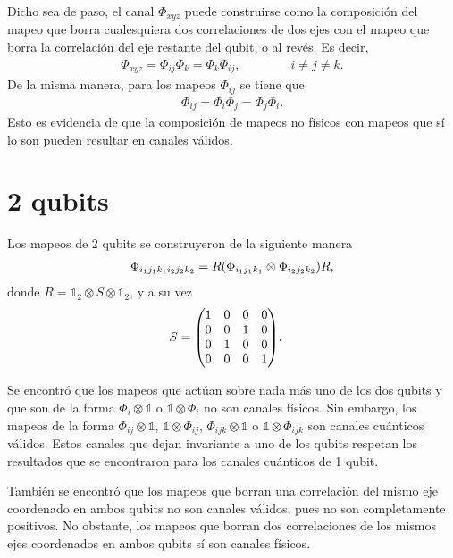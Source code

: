 \documentclass[11pt]{article}
\begin{document}
Dicho sea de paso, el canal $\Phi_{xyz}$ puede construirse como la composición del mapeo que borra cualesquiera dos correlaciones de dos ejes con el mapeo que borra la correlación del eje restante del qubit, o al revés. Es decir, 
\begin{align}
	\Phi _{xyz} = \Phi _{ij}\Phi _{k} = \Phi _{k}\Phi _{ij}, \qquad \qquad i \neq j \neq k .
\end{align} De la misma manera, para los mapeos $\Phi _{ij}$ se tiene que
\begin{align}
	\Phi _{ij} = \Phi _i \Phi _j = \Phi _j \Phi _i. 
\end{align} Esto es evidencia de que la composición de mapeos no físicos con mapeos que sí lo son pueden resultar en canales válidos. 

\section*{2 qubits}
Los mapeos de 2 qubits se construyeron de la siguiente manera
\begin{align}
	\Phi _{i_1j_1k_1i_2j_2k_2} = R \qty( \Phi _{i_1j_1k_1}\otimes \Phi _{i_2j_2k_2} ) R, 
\end{align} donde $R = \mathbb{1}_2 \otimes S \otimes \mathbb{1}_2$, y a su vez
\begin{align}
	S &= \mqty(1 & 0 & 0 & 0 \\ 0 & 0 & 1 & 0 \\ 0 & 1 & 0 & 0 \\ 0 & 0 & 0 & 1).
\end{align}

Se encontró que los mapeos que actúan sobre nada más uno de los dos qubits y que son de la forma $\Phi _i \otimes \mathbb{1}$ o $\mathbb{1} \otimes \Phi _i$ no son canales físicos. Sin embargo, los mapeos de la forma $\Phi _{ij}\otimes \mathbb{1}$, $\mathbb{1} \otimes \Phi _{ij}$, $\Phi _{ijk}\otimes \mathbb{1}$ o $\mathbb{1} \otimes \Phi _{ijk}$ son canales cuánticos válidos. Estos canales que dejan invariante a uno de los qubits respetan los resultados que se encontraron para los canales cuánticos de 1 qubit.

También se encontró que los mapeos que borran una correlación del mismo eje coordenado en ambos qubits no son canales válidos, pues no son completamente positivos. No obstante, los mapeos que borran dos correlaciones de los mismos ejes coordenados en ambos qubits sí son canales físicos.




	

	

	
	
	
	
\end{document}
